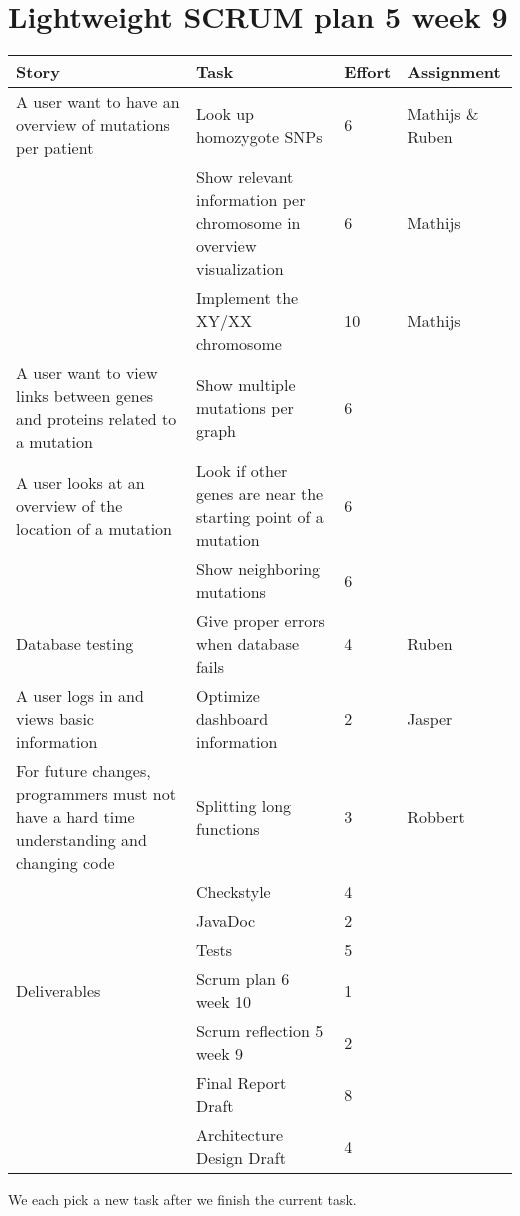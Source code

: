 \documentclass[a4paper]{report}
\begin{document}


\section*{Lightweight SCRUM plan 5 week 9}

\setlength\extrarowheight{5pt}
\begin{table}[ht]
\begin{tabular}{p{5cm}|p{5cm}|p{1cm}|p{2cm}}

\textbf{Story} & \textbf{Task} & \textbf{Effort} & \textbf{Assignment}\\
\hline \hline

A user want to have an overview of mutations per patient
& Look up homozygote SNPs & 6 & Mathijs \& Ruben\\
& Show relevant information per chromosome in overview visualization & 6 & Mathijs\\
& Implement the XY/XX chromosome & 10 & Mathijs\\
\hline

A user want to view links between genes and proteins related to a mutation 
& Show multiple mutations per graph & 6 & \\
\hline

A user looks at an overview of the location of a mutation 
& Look if other genes are near the starting point of a mutation & 6 &\\
& Show neighboring mutations & 6 &\\
\hline

Database testing 
& Give proper errors when database fails & 4 & Ruben\\
\hline

A user logs in and views basic information 
& Optimize dashboard information & 2 & Jasper\\
\hline

For future changes, programmers must not have a hard time understanding and changing code
& Splitting long functions & 3 & Robbert \\
& Checkstyle & 4 & \\
& JavaDoc & 2 & \\
& Tests & 5 & \\
\hline

Deliverables 
& Scrum plan 6 week 10 & 1 &\\
& Scrum reflection 5 week 9 & 2 &\\
& Final Report Draft & 8 &\\
& Architecture Design Draft & 4 &\\
\hline
\end{tabular}
\end{table}

We each pick a new task after we finish the current task.
\end{document}
